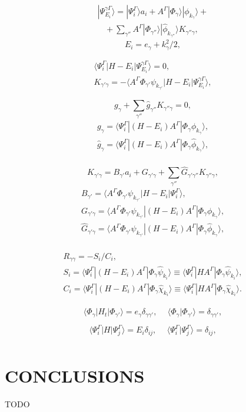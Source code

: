 \documentclass[aip
, pra
, showpacs
, aps
, twocolumn
, groupedaddress
, floatfix
]{revtex4}
\newcommand{\beq}{\begin{equation}}
\newcommand{\eeq}{\end{equation}}
\newcommand{\barr}{\begin{array}}
\newcommand{\earr}{\end{array}}
\begin{document}
\beq \barr{l}
| \Psi_{E_i}^{\gamma \Gamma} \rangle =  |\Psi_i^{\Gamma} \rangle a_i
 + A^{\Gamma} |\Phi_{\gamma}\rangle  | \phi_{k_\gamma} \rangle+\\
\ \ \ \ + \sum_{\gamma''} A^{\Gamma} |\Phi_{\gamma''}\rangle  | \widehat{\phi}_{k_{\gamma''}}\rangle K_{\gamma''\gamma},
\earr \label{Psi_} \eeq
\beq
E_i = e_\gamma + k_{\gamma}^2/2,
\eeq


\beq \barr{l}
\langle\Psi_i^\Gamma|H-E_i|\Psi_{E_i}^{\gamma \Gamma}\rangle=0,\\
K_{\gamma'\gamma} = - \langle A^{\Gamma} \Phi_{\gamma'}  \psi_{k_{\gamma'}}
| H-E_i | \Psi_{E_i}^{\gamma \Gamma} \rangle,
\earr \eeq

\beq
g_{\gamma}
+ \sum_{\gamma''} \widehat{g}_{\gamma''} K_{\gamma''\gamma} = 0,
\eeq
\beq \barr{l}
g_{\gamma} = \langle \Psi_i^\Gamma |(H - E_i) A^{\Gamma} |\Phi_{\gamma} \phi_{k_\gamma} \rangle,\\
\widehat{g}_{\gamma} = \langle \Psi_i^\Gamma |(H - E_i) A^{\Gamma} |\Phi_{\gamma} \widehat{\phi}_{k_\gamma} \rangle,\\
\earr \label{Psi_} \eeq

\beq
K_{\gamma'\gamma} =  B_{\gamma'}  a_i + G_{\gamma'\gamma}
+ \sum_{\gamma''} \widehat{G}_{\gamma'\gamma''} K_{\gamma''\gamma},
\eeq
\beq \barr{l}
B_{\gamma'} = \langle A^{\Gamma} \Phi_{\gamma'}  \psi_{k_{\gamma'}} |H - E_i |\Psi_i^{\Gamma} \rangle,\\
G_{\gamma'\gamma} = \langle A^{\Gamma} \Phi_{\gamma'}  \psi_{k_{\gamma'}} |(H - E_i) A^{\Gamma} |\Phi_{\gamma} \phi_{k_\gamma} \rangle,\\
\widehat{G}_{\gamma'\gamma} = \langle A^{\Gamma} \Phi_{\gamma'}  \psi_{k_{\gamma'}} |(H - E_i) A^{\Gamma} |\Phi_{\gamma} \widehat{\phi}_{k_\gamma} \rangle,\\
\earr \label{Psi_} \eeq


\beq \barr{l}
R_{\gamma \gamma} = - S_i / C_i, \\
S_i = \langle\Psi_i^{\Gamma}|(H-E_i ) A^{\Gamma} |    \Phi_{\gamma} \hat{\psi}_{k_i} \rangle
\equiv \langle\Psi_i^{\Gamma}|H A^{\Gamma} |    \Phi_{\gamma} \hat{\psi}_{k_i} \rangle, \\
C_i = \langle\Psi_i^{\Gamma}|(H-E_i ) A^{\Gamma} |    \Phi_{\gamma} \hat{\chi}_{k_i} \rangle
\equiv \langle\Psi_i^{\Gamma}|H A^{\Gamma} |    \Phi_{\gamma} \hat{\chi}_{k_i} \rangle.
\earr \eeq


\beq \barr{ll}
\langle \Phi_\gamma|H_t|\Phi_{\gamma'}\rangle=e_\gamma \delta_{\gamma\gamma'}, \ \
& \langle \Phi_\gamma|\Phi_{\gamma'}\rangle=\delta_{\gamma\gamma'},\\
\earr \label{psi_H_psi} \eeq
\beq \barr{ll}
\langle\Psi_i^\Gamma|H|\Psi_j^\Gamma\rangle=E_i\delta_{ij}, \ \
& \langle\Psi_i^\Gamma|\Psi_j^\Gamma\rangle=\delta_{ij},\\
\earr \label{Psi_H_Psi_JM} \eeq



\section{CONCLUSIONS}
TODO


\begin{acknowledgments}
\end{acknowledgments}





%
\end{document}
